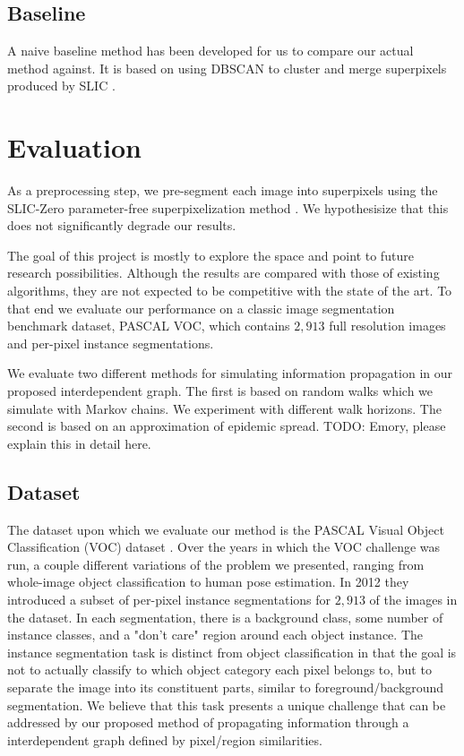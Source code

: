 \documentclass[twocolumn]{article}
\newcommand{\todo}[1]{}
\renewcommand{\todo}[1]{{\color{red} TODO: {#1}}}
\newcommand{\seclab}[1]{\label{sec:#1}}
\begin{document}
\subsection{Baseline}

A naive baseline method has been developed for us to compare our actual method
against. It is based on using DBSCAN \cite{ester1996density} to cluster and
merge superpixels produced by SLIC \cite{achanta2010slic}.

\section{Evaluation}\seclab{eval}


As a preprocessing step, we pre-segment each image into superpixels using the
SLIC-Zero parameter-free superpixelization method \cite{achanta2010slic}. We
hypothesisize that this does not significantly degrade our results. 

The goal of this project is mostly to explore the space and point to future
research possibilities. Although the results are compared with those of
existing algorithms, they are not expected to be competitive with the state of
the art. To that end we evaluate our performance on a classic image segmentation
benchmark dataset, PASCAL VOC, which contains $2,913$ full resolution images and
per-pixel instance segmentations.

We evaluate two different methods for simulating information propagation in our
proposed interdependent graph. The first is based on random walks which we
simulate with Markov chains. We experiment with different walk horizons. The
second is based on an approximation of epidemic spread. \todo{Emory, please
explain this in detail here.}

\subsection{Dataset}\seclab{data}

The dataset upon which we evaluate our method is the PASCAL Visual Object
Classification (VOC) dataset \cite{Everingham10}. Over the years in which the
VOC challenge was run, a couple different variations of the problem we
presented, ranging from whole-image object classification to human pose
estimation. In 2012 they introduced a subset of per-pixel instance segmentations
for $2,913$ of the images in the dataset. In each segmentation, there is a
background class, some number of instance classes, and a "don't care" region
around each object instance. The instance segmentation task is distinct from
object classification in that the goal is not to actually classify to which
object category each pixel belongs to, but to separate the image into its
constituent parts, similar to foreground/background segmentation. We believe
that this task presents a unique challenge that can be addressed by our proposed
method of propagating information through a interdependent graph defined by
pixel/region similarities.
\end{document}
